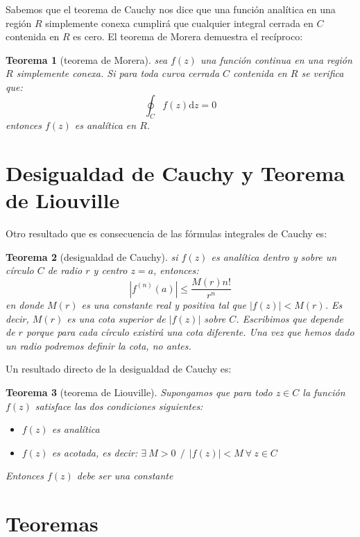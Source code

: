 \documentclass[12pt]{book}
\newcommand{\D}{\mathrm{d}}
\newtheorem{theorem}{Teorema}[section]
\begin{document}
Sabemos que el teorema de Cauchy nos dice que una función analítica en una región $R$ simplemente conexa cumplirá que cualquier integral cerrada en $C$ contenida en $R$ es cero. El teorema de Morera demuestra el recíproco:

\begin{theorem}[teorema de Morera]
sea $f(z)$ una función continua en una región $R$ simplemente conexa. Si para toda curva cerrada $C$ contenida en $R$ se verifica que: 
$$ \oint_C f(z) \D z = 0 $$
entonces $f(z)$ es analítica en $R$.
\end{theorem}

\section{Desigualdad de Cauchy y Teorema de Liouville}

Otro resultado que es consecuencia de las fórmulas integrales de Cauchy es:

\begin{theorem}[desigualdad de Cauchy]
si $f(z)$ es analítica dentro y sobre un círculo $C$ de radio $r$ y centro $z=a$, entonces:
$$ \left|  f^{(n)}(a) \right| \leq \frac{M(r) n!}{r^n}$$
en donde $M(r)$ es una constante real y positiva tal que $|f(z)|<M(r)$. Es decir, $M(r)$ es una cota superior de $|f(z)|$ sobre $C$. Escribimos que depende de $r$ porque para cada círculo existirá una cota diferente. Una vez que hemos dado un radio podremos definir la cota, no antes.
\end{theorem}

Un resultado directo de la desigualdad de Cauchy es:

\begin{theorem}[teorema de Liouville]
Supongamos que para todo $z \in C$ la función $f(z)$ satisface las dos condiciones siguientes:

\begin{itemize}
\item $f(z)$ es analítica 
\item $f(z)$ es acotada, es decir:   $\exists \ M > 0 \ \ / \ \ |f(z)|<M  \  \forall  \ z \in C$
\end{itemize}
Entonces $f(z)$ debe ser una constante

\end{theorem}

\section{Teoremas}
\end{document}
